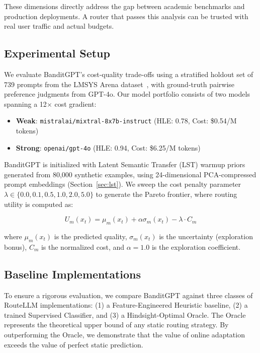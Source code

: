 These dimensions directly address the gap between academic benchmarks and production deployments. A router that passes this analysis can be trusted with real user traffic and actual budgets.

\subsection{Experimental Setup}

We evaluate BanditGPT's cost-quality trade-offs using a stratified holdout set of 739 prompts from the LMSYS Arena dataset~\cite{zheng2023judging}, with ground-truth pairwise preference judgments from GPT-4o. Our model portfolio consists of two models spanning a 12$\times$ cost gradient:

\begin{itemize}
    \item \textbf{Weak}: \texttt{mistralai/mixtral-8x7b-instruct} (HLE: 0.78, Cost: \$0.54/M tokens)
    \item \textbf{Strong}: \texttt{openai/gpt-4o} (HLE: 0.94, Cost: \$6.25/M tokens)
\end{itemize}

BanditGPT is initialized with Latent Semantic Transfer (LST) warmup priors generated from 80,000 synthetic examples, using 24-dimensional PCA-compressed prompt embeddings (Section~\ref{sec:lst}). We sweep the cost penalty parameter $\lambda \in \{0.0, 0.1, 0.5, 1.0, 2.0, 5.0\}$ to generate the Pareto frontier, where routing utility is computed as:

\begin{equation}
    U_m(x_t) = \mu_m(x_t) + \alpha \sigma_m(x_t) - \lambda \cdot C_m
\end{equation}

where $\mu_m(x_t)$ is the predicted quality, $\sigma_m(x_t)$ is the uncertainty (exploration bonus), $C_m$ is the normalized cost, and $\alpha=1.0$ is the exploration coefficient.

\subsection{Baseline Implementations}

To ensure a rigorous evaluation, we compare BanditGPT against three classes of RouteLLM implementations: (1) a Feature-Engineered Heuristic baseline, (2) a trained Supervised Classifier, and (3) a Hindsight-Optimal Oracle. The Oracle represents the theoretical upper bound of any static routing strategy. By outperforming the Oracle, we demonstrate that the value of online adaptation exceeds the value of perfect static prediction.

